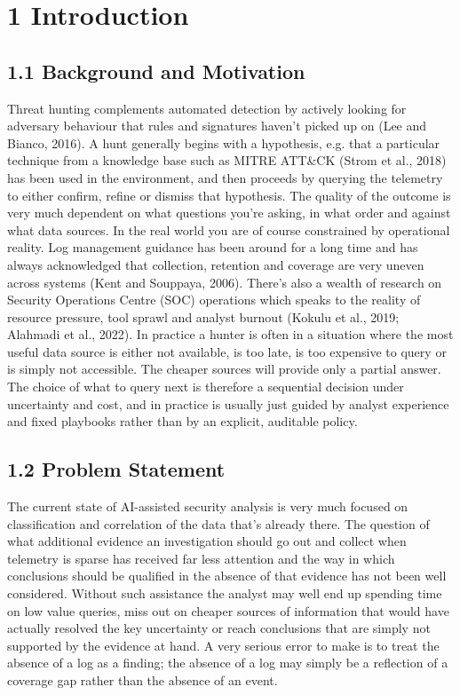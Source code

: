 \documentclass[a4paper,11pt]{article}
\begin{document}
\section{1 Introduction}
\subsection{1.1 Background and Motivation}
Threat hunting complements automated detection by actively looking for adversary behaviour that rules and signatures haven't picked up on (Lee and Bianco, 2016). A hunt generally begins with a hypothesis, e.g. that a particular technique from a knowledge base such as MITRE ATT\&CK (Strom et al., 2018) has been used in the environment, and then proceeds by querying the telemetry to either confirm, refine or dismiss that hypothesis. The quality of the outcome is very much dependent on what questions you're asking, in what order and against what data sources. In the real world you are of course constrained by operational reality. Log management guidance has been around for a long time and has always acknowledged that collection, retention and coverage are very uneven across systems (Kent and Souppaya, 2006). There's also a wealth of research on Security Operations Centre (SOC) operations which speaks to the reality of resource pressure, tool sprawl and analyst burnout (Kokulu et al., 2019; Alahmadi et al., 2022). In practice a hunter is often in a situation where the most useful data source is either not available, is too late, is too expensive to query or is simply not accessible. The cheaper sources will provide only a partial answer. The choice of what to query next is therefore a sequential decision under uncertainty and cost, and in practice is usually just guided by analyst experience and fixed playbooks rather than by an explicit, auditable policy.\par
\subsection{1.2 Problem Statement}
The current state of AI-assisted security analysis is very much focused on classification and correlation of the data that's already there. The question of what additional evidence an investigation should go out and collect when telemetry is sparse has received far less attention and the way in which conclusions should be qualified in the absence of that evidence has not been well considered. Without such assistance the analyst may well end up spending time on low value queries, miss out on cheaper sources of information that would have actually resolved the key uncertainty or reach conclusions that are simply not supported by the evidence at hand. A very serious error to make is to treat the absence of a log as a finding; the absence of a log may simply be a reflection of a coverage gap rather than the absence of an event.\par
\end{document}
